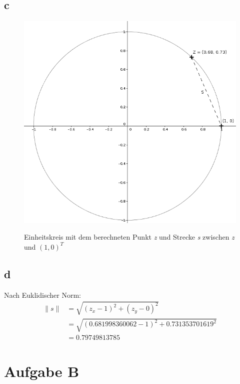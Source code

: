 \documentclass{../Vorlage/mat}
\begin{document}
\subsection*{c}
\begin{figure}[!htb]
\centering
	\includegraphics[scale=0.5]{circle_s.png}
	\label{circles}
	\caption{Einheitskreis mit dem berechneten Punkt \textit{z} und Strecke \textit{s} zwischen \textit{z} und $(1,0)^T$}
\end{figure}

\subsection*{d}
Nach Euklidischer Norm:
\begin{align*}
\|s\| & = \sqrt{(z_x - 1)^2 + (z_y - 0)^2}\\
& = \sqrt{(0.681998360062 - 1)^2 + 0.731353701619^2}\\
& = 0.79749813785
\end{align*}

\section*{Aufgabe B}
\end{document}
